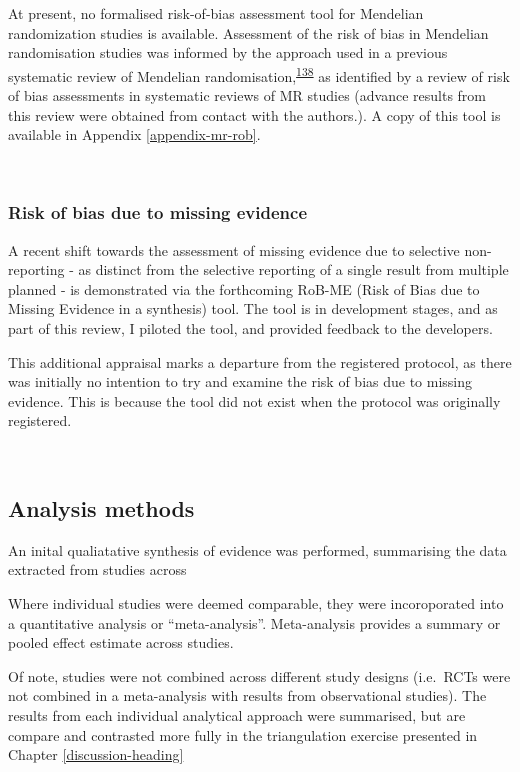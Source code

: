 \documentclass[a4paper, twoside]{templates/ociamthesis}
\begin{document}
At present, no formalised risk-of-bias assessment tool for Mendelian randomization studies is available. Assessment of the risk of bias in Mendelian randomisation studies was informed by the approach used in a previous systematic review of Mendelian randomisation,\textsuperscript{\protect\hyperlink{ref-mamluk2020}{138}} as identified by a review of risk of bias assessments in systematic reviews of MR studies (advance results from this review were obtained from contact with the authors.). A copy of this tool is available in Appendix \ref{appendix-mr-rob}.

~

\hypertarget{risk-of-bias-due-to-missing-evidence}{%
\subsubsection{Risk of bias due to missing evidence}\label{risk-of-bias-due-to-missing-evidence}}

A recent shift towards the assessment of missing evidence due to selective non-reporting - as distinct from the selective reporting of a single result from multiple planned - is demonstrated via the forthcoming RoB-ME (Risk of Bias due to Missing Evidence in a synthesis) tool. The tool is in development stages, and as part of this review, I piloted the tool, and provided feedback to the developers.

This additional appraisal marks a departure from the registered protocol, as there was initially no intention to try and examine the risk of bias due to missing evidence. This is because the tool did not exist when the protocol was originally registered.

~

\hypertarget{analysis-methods}{%
\subsection{Analysis methods}\label{analysis-methods}}

An inital qualiatative synthesis of evidence was performed, summarising the data extracted from studies across

Where individual studies were deemed comparable, they were incoroporated into a quantitative analysis or ``meta-analysis''. Meta-analysis provides a summary or pooled effect estimate across studies.

Of note, studies were not combined across different study designs (i.e.~RCTs were not combined in a meta-analysis with results from observational studies). The results from each individual analytical approach were summarised, but are compare and contrasted more fully in the triangulation exercise presented in Chapter \ref{discussion-heading}
\end{document}

